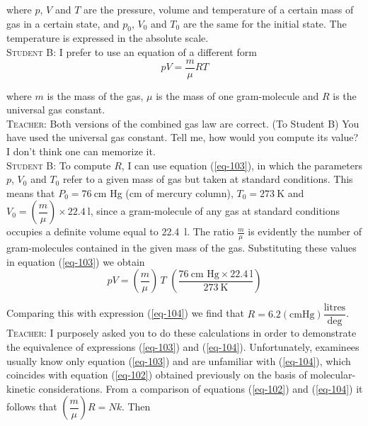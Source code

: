 \documentclass[a4paper,sfsidenotes]{tufte-book}
\begin{document}
where $p$, $V$ and $T$ are the pressure, volume and temperature of a certain mass of gas in a certain
state, and $p_{0}$, $V_{0}$ and $T_{0}$ are the same for the initial state. The temperature is expressed in the absolute scale.
\\
\textsc{Student B:} I prefer to use an equation of a different form
\begin{equation}%
pV = \frac{m}{\mu} RT
\label{eq-104}
\end{equation}

where $m$ is the mass of the gas, $\mu$ is the mass of one gram-molecule and $R$ is the universal gas constant.
\\
\textsc{Teacher:} Both versions of the combined gas law are correct. (To Student B) You have used the universal gas constant. Tell me, how would you compute its value? I don't think one can memorize it.
\\
\textsc{Student B:} To compute $R$, I can use equation (\ref{eq-103}), in which the parameters $p$, $V_{0}$ and $T_{0}$ refer to a given mass of gas but taken at standard conditions. This means that $P_{0}= \SI{76}{\centi\meter}$ Hg (\si{\centi\meter} of mercury column), $T_{0}=\SI{273}{\kelvin}$ and $V_{0} =\left( \dfrac{m}{\mu} \right) \times \SI{22.4}{\litre}$, since a gram-molecule of any gas at standard conditions occupies a definite volume equal to \SI{22.4}{\litre}. The ratio $\frac{m}{\mu}$ is evidently the number of gram-molecules contained in the given mass of the gas. Substituting these values in equation (\ref{eq-103}) we obtain
\begin{equation*}%
pV = \left( \frac{m}{\mu}\right) \, T \,\, \left( \frac{\SI{76}{\centi\meter} \,\,\text{Hg} \times \SI{22.4}{\litre}}{\SI{273}{\kelvin}} \right)
\end{equation*}

Comparing this with expression (\ref{eq-104}) we find that $R=6.2 (\si{\centi\meter} \text{Hg}) \dfrac{\text{litres}}{\text{deg}}$.
\\
\textsc{Teacher:} I purposely asked you to do these calculations in order to demonstrate the equivalence of expressions (\ref{eq-103}) and (\ref{eq-104}). Unfortunately, examinees usually know only equation (\ref{eq-103}) and are unfamiliar with (\ref{eq-104}), which coincides with equation (\ref{eq-102}) obtained previously on the basis of molecular-kinetic considerations. From a comparison of equations (\ref{eq-102}) and (\ref{eq-104}) it follows that $\left( \dfrac{m}{\mu} \right)R=Nk$. Then
\end{document}
